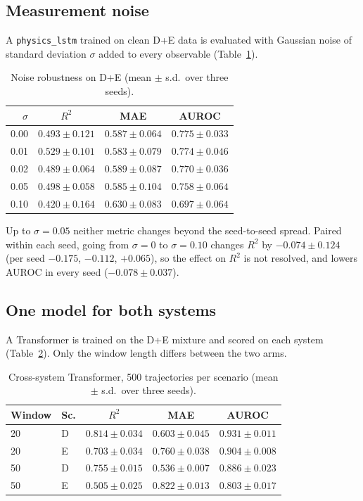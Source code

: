 \documentclass[twocolumn,10pt]{article}
\begin{document}
\subsection{Measurement noise}
\label{sec:e3}

A \texttt{physics\_lstm} trained on clean D+E data is evaluated with
Gaussian noise of standard deviation $\sigma$ added to every observable
(Table~\ref{tab:e3_2}).

\begin{table}[h]
\centering
\caption{Noise robustness on D+E (mean $\pm$ s.d.\ over three
  seeds).\label{tab:e3_2}}
\small
\begin{tabular}{rccc}
\toprule
$\sigma$ & $R^2$ & MAE & AUROC \\
\midrule
0.00 & $0.493 \pm 0.121$ & $0.587 \pm 0.064$ & $0.775 \pm 0.033$ \\
0.01 & $0.529 \pm 0.101$ & $0.583 \pm 0.079$ & $0.774 \pm 0.046$ \\
0.02 & $0.489 \pm 0.064$ & $0.589 \pm 0.087$ & $0.770 \pm 0.036$ \\
0.05 & $0.498 \pm 0.058$ & $0.585 \pm 0.104$ & $0.758 \pm 0.064$ \\
0.10 & $0.420 \pm 0.164$ & $0.630 \pm 0.083$ & $0.697 \pm 0.064$ \\
\bottomrule
\end{tabular}
\end{table}

Up to $\sigma = 0.05$ neither metric changes beyond the seed-to-seed
spread. Paired within each seed, going from $\sigma = 0$ to
$\sigma = 0.10$ changes $R^2$ by $-0.074 \pm 0.124$ (per seed $-0.175$,
$-0.112$, $+0.065$), so the effect on $R^2$ is not resolved, and lowers
AUROC in every seed ($-0.078 \pm 0.037$).

\subsection{One model for both systems}
\label{sec:e11a}

A Transformer is trained on the D+E mixture and scored on each system
(Table~\ref{tab:r3}).
Only the window length differs between the two arms.

\begin{table}[h]
\centering
\caption{Cross-system Transformer, 500 trajectories per scenario
  (mean $\pm$ s.d.\ over three seeds).\label{tab:r3}}
\footnotesize
\setlength{\tabcolsep}{3pt}
\begin{tabular}{llccc}
\toprule
Window & Sc. & $R^2$ & MAE & AUROC \\
\midrule
20 & D & $\mathbf{0.814 \pm 0.034}$ & $0.603 \pm 0.045$ & $\mathbf{0.931 \pm 0.011}$ \\
20 & E & $\mathbf{0.703 \pm 0.034}$ & $0.760 \pm 0.038$ & $\mathbf{0.904 \pm 0.008}$ \\
50 & D & $0.755 \pm 0.015$ & $0.536 \pm 0.007$ & $0.886 \pm 0.023$ \\
50 & E & $0.505 \pm 0.025$ & $0.822 \pm 0.013$ & $0.803 \pm 0.017$ \\
\bottomrule
\end{tabular}
\end{table}
\end{document}
